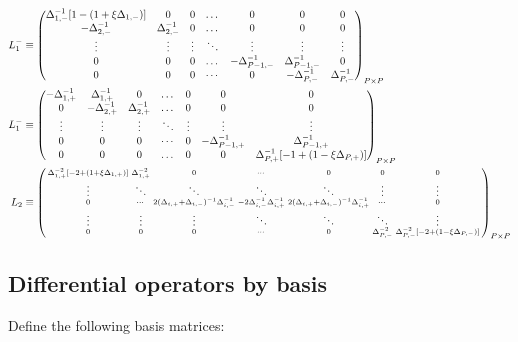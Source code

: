 \documentclass[11pt]{article}
\newenvironment{psmallmatrix}
{\left(\begin{smallmatrix}}
	{\end{smallmatrix}\right)}
\begin{document}
\begin{align}
L_1^{-} &\equiv \begin{pmatrix}
\Delta^{-1}_{1,-} [1 - (1 + \xi \Delta_{1,-})] &0&0&\dots&0&0&0\\
-\Delta_{2,-}^{-1}&\Delta_{2,-}^{-1}&0&\dots&0&0&0\\
\vdots&\vdots&\vdots&\ddots&\vdots&\vdots&\vdots\\
0&0&0&\dots&-\Delta_{P-1,-}^{-1}&\Delta_{P-1,-}^{-1}&0\\
0&0&0&\cdots&0&-\Delta_{P,-}^{-1}&\Delta_{P,-}^{-1}
\end{pmatrix}_{P\times P}\label{eq:L-1} \\
L_1^{-} &\equiv \begin{pmatrix}
-\Delta_{1,+}^{-1}&\Delta_{1,+}^{-1}&0&\dots&0&0&0\\
0&-\Delta_{2,+}^{-1}&\Delta_{2,+}^{-1}&\dots&0&0&0\\
\vdots&\vdots&\vdots&\ddots&\vdots&\vdots&\vdots\\
0&0&0&\cdots&0&-\Delta_{P-1,+}^{-1}&\Delta_{P-1,+}^{-1}\\
0&0&0&\dots&0&0&\Delta_{P,+}^{-1}  [-1 + (1 - \xi \Delta_{P,+})]  \\
\end{pmatrix}_{P\times P}\label{eq:L-1-plus} \\
L_2 &\equiv \begin{psmallmatrix}
\Delta_{1,+}^{-2}[-2 + (1+\xi \Delta_{1,+})] &\Delta_{1,+}^{-2}&0&\cdots&0&0&0 \\
\vdots&\ddots&\ddots&\ddots&\ddots&\vdots&\vdots\\
0&\cdots&2(\Delta_{i,+}+\Delta_{i,-})^{-1} \Delta_{i,-}^{-1} &-2\Delta_{i,-}^{-1} \Delta_{i,+}^{-1}  & 2 (\Delta_{i,+}+\Delta_{i,-})^{-1} \Delta_{i,+}^{-1}&\cdots&0 \\
\vdots&\vdots&\vdots&\ddots&\ddots&\ddots&\vdots\\
0&0&0&\cdots&0&\Delta_{P,-}^{-2}&\Delta_{P,-}^{-2} [-2 + (1- \xi\Delta_{P,-})]
\end{psmallmatrix}_{P\times P}\label{eq:L-2}
\end{align}

\subsection{Differential operators by basis}
Define the following basis matrices:
\end{document}
